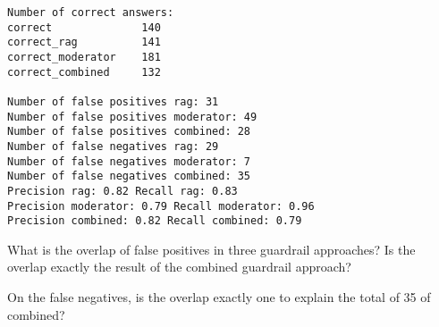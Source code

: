 %

\begin{verbatim}
Number of correct answers:
correct              140
correct_rag          141
correct_moderator    181
correct_combined     132

Number of false positives rag: 31
Number of false positives moderator: 49
Number of false positives combined: 28
Number of false negatives rag: 29
Number of false negatives moderator: 7
Number of false negatives combined: 35
Precision rag: 0.82 Recall rag: 0.83
Precision moderator: 0.79 Recall moderator: 0.96
Precision combined: 0.82 Recall combined: 0.79
\end{verbatim}

What is the overlap of false positives in three guardrail approaches?
Is the overlap exactly the result of the combined guardrail approach?

On the false negatives, is the overlap exactly one to explain the total of 35 of combined?
